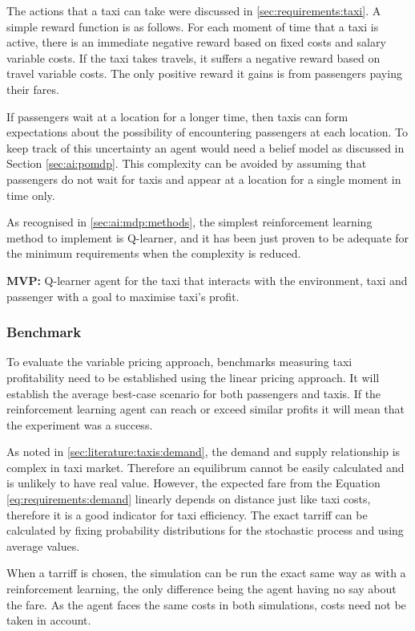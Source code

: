 The actions that a taxi can take were discussed in \ref{sec:requirements:taxi}.
A simple reward function is as follows. For each moment of time that a taxi is
active, there is an immediate negative reward based on fixed costs and salary
variable costs. If the taxi takes travels, it suffers a negative reward based
on travel variable costs. The only positive reward it gains is from passengers
paying their fares.

If passengers wait at a location for a longer time, then taxis can form
expectations about the possibility of encountering passengers at each location.
To keep track of this uncertainty an agent would need a belief model as
discussed in Section \ref{sec:ai:pomdp}. This complexity can be avoided by
assuming that passengers do not wait for taxis and appear at a location for a
single moment in time only.

As recognised in \ref{sec:ai:mdp:methods}, the simplest reinforcement learning
method to implement is Q-learner, and it has been just proven to be adequate
for the minimum requirements when the complexity is reduced.

\textbf{MVP:} Q-learner agent for the taxi that interacts with the environment,
taxi and passenger with a goal to maximise taxi's profit.


\subsubsection{Benchmark} 

To evaluate the variable pricing approach, benchmarks measuring taxi
profitability need to be established using the linear pricing approach. It will
establish the average best-case scenario for both passengers and taxis. If the
reinforcement learning agent can reach or exceed similar profits it will mean
that the experiment was a success.

As noted in \ref{sec:literature:taxis:demand}, the demand and supply
relationship is complex in taxi market. Therefore an equilibrum cannot be
easily calculated and is unlikely to have real value. However, the expected
fare from the Equation \ref{eq:requirements:demand} linearly depends on
distance just like taxi costs, therefore it is a good indicator for taxi
efficiency. The exact tarriff can be calculated by fixing probability
distributions for the stochastic process and using average values.

When a tarriff is chosen, the simulation can be run the exact same way as with
a reinforcement learning, the only difference being the agent having no say
about the fare. As the agent faces the same costs in both simulations, costs
need not be taken in account.

